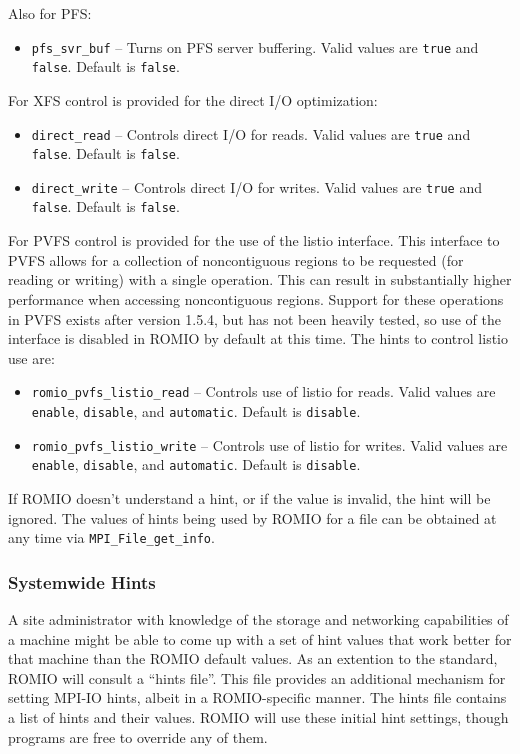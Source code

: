 Also for PFS:
\begin{itemize}
\item \texttt{pfs\_svr\_buf} -- Turns on PFS server buffering.  Valid
values are \texttt{true} and \texttt{false}.  Default is \texttt{false}.
\end{itemize}

For XFS control is provided for the direct I/O optimization:
\begin{itemize}
\item \texttt{direct\_read} -- Controls direct I/O for reads.  Valid
values are \texttt{true} and \texttt{false}.  Default is \texttt{false}.
\item \texttt{direct\_write} -- Controls direct I/O for writes.  Valid
values are \texttt{true} and \texttt{false}.  Default is \texttt{false}.
\end{itemize}

For PVFS control is provided for the use of the listio interface.  This
interface to PVFS allows for a collection of noncontiguous regions to be
requested (for reading or writing) with a single operation.  This can result
in substantially higher performance when accessing noncontiguous regions.
Support for these operations in PVFS exists after version 1.5.4, but has not
been heavily tested, so use of the interface is disabled in ROMIO by default
at this time.  The hints to control listio use are:
\begin{itemize}
\item \texttt{romio\_pvfs\_listio\_read} -- Controls use of listio for reads.
Valid values are \texttt{enable}, \texttt{disable}, and \texttt{automatic}.
Default is \texttt{disable}.
\item \texttt{romio\_pvfs\_listio\_write} -- Controls use of listio for writes.
Valid values are \texttt{enable}, \texttt{disable}, and \texttt{automatic}.
Default is \texttt{disable}.
\end{itemize}

If ROMIO doesn't understand a hint, or if the value is invalid, the hint
will be ignored. The values of hints being used by ROMIO for a file
can be obtained at any time via {\tt MPI\_File\_get\_info}.

\subsubsection{Systemwide Hints}
\label{sec:system_hints}

A site administrator with knowledge of the storage and networking capabilities
of a machine might be able to come up with a set of hint values that work
better for that machine than the ROMIO default values.  As an extention to the
standard, ROMIO will consult a ``hints file''.  This file provides an
additional mechanism for setting MPI-IO hints, albeit in a ROMIO-specific
manner.  The hints file contains a list of hints and their values.  ROMIO will
use these initial hint settings, though programs are free to override any of
them.

